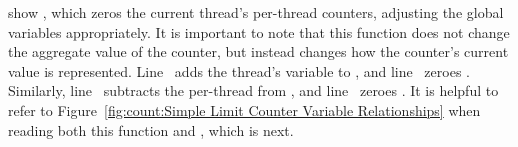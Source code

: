 \begin{fcvref}
 show ,
which zeros the current thread's
per-thread counters, adjusting the global variables appropriately.
It is important to note that this function does not change the aggregate
value of the counter, but instead changes how the counter's current value
is represented.
Line~ adds the thread's  variable to ,
and line~ zeroes .
Similarly, line~ subtracts the per-thread  from
, and line~ zeroes .
It is helpful to refer to
Figure~\ref{fig:count:Simple Limit Counter Variable Relationships}
when reading both this function and , which is next.
\end{fcvref}

\fi

